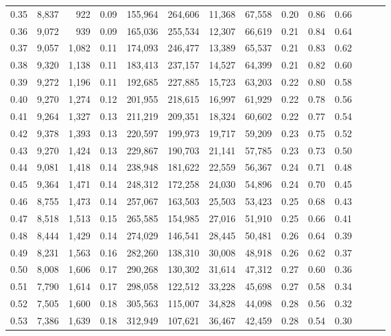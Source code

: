 \begin{tabular}{rrrrrrrrrrrrrr}
0.35 &  8,837 &    922 &  0.09 &  155,964 &  264,606 &  11,368 &  67,558 &  0.20 &  0.86 &      0.66 \\
0.36 &  9,072 &    939 &  0.09 &  165,036 &  255,534 &  12,307 &  66,619 &  0.21 &  0.84 &      0.64 \\
0.37 &  9,057 &  1,082 &  0.11 &  174,093 &  246,477 &  13,389 &  65,537 &  0.21 &  0.83 &      0.62 \\
0.38 &  9,320 &  1,138 &  0.11 &  183,413 &  237,157 &  14,527 &  64,399 &  0.21 &  0.82 &      0.60 \\
0.39 &  9,272 &  1,196 &  0.11 &  192,685 &  227,885 &  15,723 &  63,203 &  0.22 &  0.80 &      0.58 \\
0.40 &  9,270 &  1,274 &  0.12 &  201,955 &  218,615 &  16,997 &  61,929 &  0.22 &  0.78 &      0.56 \\
0.41 &  9,264 &  1,327 &  0.13 &  211,219 &  209,351 &  18,324 &  60,602 &  0.22 &  0.77 &      0.54 \\
0.42 &  9,378 &  1,393 &  0.13 &  220,597 &  199,973 &  19,717 &  59,209 &  0.23 &  0.75 &      0.52 \\
0.43 &  9,270 &  1,424 &  0.13 &  229,867 &  190,703 &  21,141 &  57,785 &  0.23 &  0.73 &      0.50 \\
0.44 &  9,081 &  1,418 &  0.14 &  238,948 &  181,622 &  22,559 &  56,367 &  0.24 &  0.71 &      0.48 \\
0.45 &  9,364 &  1,471 &  0.14 &  248,312 &  172,258 &  24,030 &  54,896 &  0.24 &  0.70 &      0.45 \\
0.46 &  8,755 &  1,473 &  0.14 &  257,067 &  163,503 &  25,503 &  53,423 &  0.25 &  0.68 &      0.43 \\
0.47 &  8,518 &  1,513 &  0.15 &  265,585 &  154,985 &  27,016 &  51,910 &  0.25 &  0.66 &      0.41 \\
0.48 &  8,444 &  1,429 &  0.14 &  274,029 &  146,541 &  28,445 &  50,481 &  0.26 &  0.64 &      0.39 \\
0.49 &  8,231 &  1,563 &  0.16 &  282,260 &  138,310 &  30,008 &  48,918 &  0.26 &  0.62 &      0.37 \\
0.50 &  8,008 &  1,606 &  0.17 &  290,268 &  130,302 &  31,614 &  47,312 &  0.27 &  0.60 &      0.36 \\
0.51 &  7,790 &  1,614 &  0.17 &  298,058 &  122,512 &  33,228 &  45,698 &  0.27 &  0.58 &      0.34 \\
0.52 &  7,505 &  1,600 &  0.18 &  305,563 &  115,007 &  34,828 &  44,098 &  0.28 &  0.56 &      0.32 \\
0.53 &  7,386 &  1,639 &  0.18 &  312,949 &  107,621 &  36,467 &  42,459 &  0.28 &  0.54 &      0.30 \\

\end{tabular}
